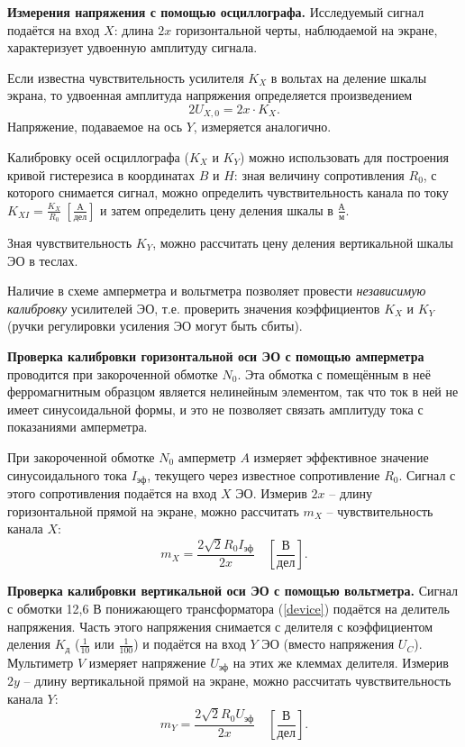 \documentclass[a4paper, 12pt]{article}
\begin{document}
        \textbf{Измерения напряжения с помощью осциллографа.} Исследуемый сигнал подаётся на вход $X$: длина $2x$ горизонтальной черты, наблюдаемой на экране, характеризует удвоенную амплитуду сигнала.

        Если известна чувствительность усилителя $K_X$ в вольтах на деление шкалы экрана, то удвоенная амплитуда напряжения определяется произведением\[2U_{X,0}=2x\cdot K_X.\]Напряжение, подаваемое на ось $Y$, измеряется аналогично.

        Калибровку осей осциллографа ($K_X$ и $K_Y$) можно использовать для построения кривой гистерезиса в координатах $B$ и $H$: зная величину сопротивления $R_0$, с которого снимается сигнал, можно определить чувствительность канала по току $K_{XI}=\frac{K_X}{R_0}\ \left[\frac{\text{А}}{\text{дел}}\right]$ и затем определить цену деления шкалы в $\frac{\text{А}}{\text{м}}$.

        Зная чувствительность $K_Y$, можно рассчитать цену деления вертикальной шкалы ЭО в теслах.

        Наличие в схеме амперметра и вольтметра позволяет провести \textit{независимую калибровку} усилителей ЭО, т.е. проверить значения коэффициентов $K_X$ и $K_Y$ (ручки регулировки усиления ЭО могут быть сбиты).

        \textbf{Проверка калибровки горизонтальной оси ЭО с помощью амперметра} проводится при закороченной обмотке $N_0$. Эта обмотка с помещённым в неё ферромагнитным образцом является нелинейным элементом, так что ток в ней не имеет синусоидальной формы, и это не позволяет связать амплитуду тока с показаниями амперметра.

        При закороченной обмотке $N_0$ амперметр $A$ измеряет эффективное значение синусоидального тока $I_{\text{эф}}$, текущего через известное сопротивление $R_0$. Сигнал с этого сопротивления подаётся на вход $X$ ЭО. Измерив $2x$ -- длину горизонтальной прямой на экране, можно рассчитать $m_X$ -- чувствительность канала $X$:\[m_X=\frac{2\sqrt2R_0I_{\text{эф}}}{2x}\quad\left[\frac{\text{В}}{\text{дел}}\right].\]

        \textbf{Проверка калибровки вертикальной оси ЭО с помощью вольтметра.} Сигнал с обмотки 12,6 В понижающего трансформатора (\ref{device}) подаётся на делитель напряжения. Часть этого напряжения снимается с делителя с коэффициентом деления $K_{\text{д}}$ ($\frac{1}{10}$ или $\frac{1}{100}$) и подаётся на вход $Y$ ЭО (вместо напряжения $U_C$). Мультиметр $V$ измеряет напряжение $U_{\text{эф}}$ на этих же клеммах делителя. Измерив $2y$ -- длину вертикальной прямой на экране, можно рассчитать чувствительность канала $Y$:\[m_Y=\frac{2\sqrt2R_0U_{\text{эф}}}{2x}\quad\left[\frac{\text{В}}{\text{дел}}\right].\]
\end{document}
